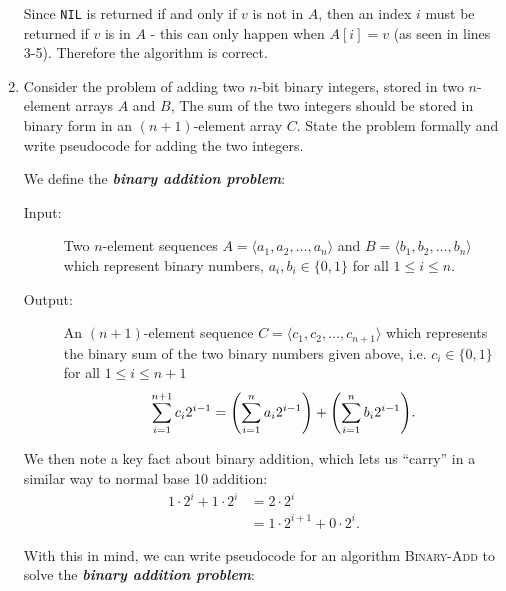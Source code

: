 \documentclass[Chapter02]{subfiles}
\begin{document}
\begin{enumerate}[leftmargin=\labelsep]
\begin{answer}
			Since \texttt{NIL} is returned if and only if $v$ is not in $A$, then an index $i$ must be returned if $v$ is in $A$ - this can only happen when $A[i] = v$ (as seen in lines 3-5). Therefore the algorithm is correct.
		\end{answer}

		\item Consider the problem of adding two $n$-bit binary integers, stored in two $n$-element arrays $A$ and $B$, The sum of the two integers should be stored in binary form in an $(n + 1)$-element array $C$. State the problem formally and write pseudocode for adding the two integers.
		\begin{answer}
			We define the \textbf{\textit{binary addition problem}}:
			\begin{description}
				\item[Input:] Two $n$-element sequences $A = \langle a_1, a_2, \dots, a_n \rangle$ and $B = \langle b_1, b_2, \dots, b_n \rangle$ which represent binary numbers, $a_i,b_i \in \{0, 1\}$ for all $1 \leq i \leq n$.

				\item[Output:] An $(n + 1)$-element sequence $C = \langle c_1, c_2, \dots, c_{n + 1} \rangle$ which represents the binary sum of the two binary numbers given above, i.e. $c_i \in \{0, 1\}$ for all $1 \leq i \leq n + 1$
				\[
					\sum_{i = 1}^{n + 1} c_i2^{i - 1} = \qty(\sum_{i = 1}^{n} a_i2^{i - 1}) + \qty(\sum_{i = 1}^{n} b_i2^{i - 1}).
				\]
			\end{description}

			We then note a key fact about binary addition, which lets us ``carry'' in a similar way to normal base 10 addition:
			\begin{align}
				1\cdot2^i + 1\cdot2^i &= 2\cdot2^i \nonumber\\
				                      &= 1\cdot2^{i + 1} + 0\cdot2^i. \label{eq:ch02-binary-add-carry}
			\end{align}

			With this in mind, we can write pseudocode for an algorithm \textsc{Binary-Add} to solve the \textbf{\textit{binary addition problem}}:

			\begin{algorithm}[H]

			\end{algorithm}


\end{answer}
\end{enumerate}
\end{document}
